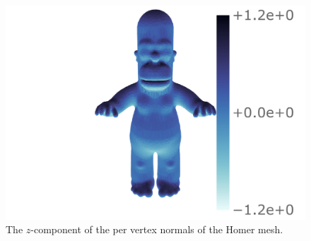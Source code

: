 \begin{figure}[htp]
	\centering
	\includegraphics[trim={156 8 21 6},clip,width=.7\textwidth]{homer_field.pdf}
	\caption{
		The \(z\)-component of the per vertex normals of the Homer mesh.
	}\label{fig:chapter4_homer_data}
\end{figure}
